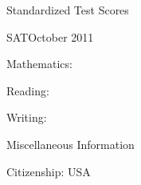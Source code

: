 \documentclass{resume}
\begin{document}
{\begin{rSection}{Standardized Test Scores}
  \begin{rSubSection}{SAT}{October 2011}{}{}
  \item Mathematics:  
  \item Reading: \tab{}  
  \item Writing: \tab{}  
  \end{rSubSection}

  \end{rSection}

  \begin{rSection}{Miscellaneous Information}

  Citizenship: USA

  \end{rSection}

}
\end{document}
